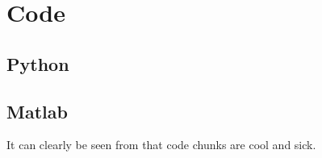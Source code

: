 \section{Code}

\subsection{Python}
    
\newpage

\subsection{Matlab}
    
    It can clearly be seen from  that code chunks are cool and sick.
